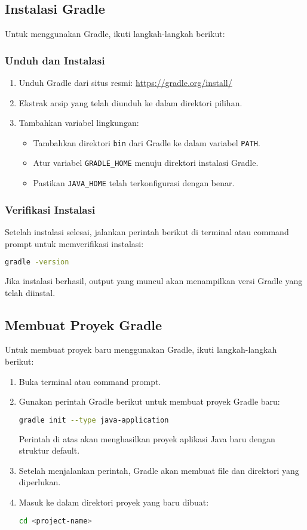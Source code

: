 \subsection{Instalasi Gradle}
Untuk menggunakan Gradle, ikuti langkah-langkah berikut:

\subsubsection{Unduh dan Instalasi}
\begin{enumerate}
	\item Unduh Gradle dari situs resmi: \url{https://gradle.org/install/}
	\item Ekstrak arsip yang telah diunduh ke dalam direktori pilihan.
	\item Tambahkan variabel lingkungan:
	\begin{itemize}
		\item Tambahkan direktori \texttt{bin} dari Gradle ke dalam variabel \texttt{PATH}.
		\item Atur variabel \texttt{GRADLE\_HOME} menuju direktori instalasi Gradle.
		\item Pastikan \texttt{JAVA\_HOME} telah terkonfigurasi dengan benar.
	\end{itemize}
\end{enumerate}

\subsubsection{Verifikasi Instalasi}
Setelah instalasi selesai, jalankan perintah berikut di terminal atau command prompt untuk memverifikasi instalasi:

\begin{lstlisting}[language=bash]
	gradle -version
\end{lstlisting}

Jika instalasi berhasil, output yang muncul akan menampilkan versi Gradle yang telah diinstal.


\subsection{Membuat Proyek Gradle}
Untuk membuat proyek baru menggunakan Gradle, ikuti langkah-langkah berikut:
\begin{enumerate}
	\item Buka terminal atau command prompt.
	\item Gunakan perintah Gradle berikut untuk membuat proyek Gradle baru:
	\begin{lstlisting}[language=bash]
		gradle init --type java-application
	\end{lstlisting}
	Perintah di atas akan menghasilkan proyek aplikasi Java baru dengan struktur default.
	\item Setelah menjalankan perintah, Gradle akan membuat file dan direktori yang diperlukan.
	\item Masuk ke dalam direktori proyek yang baru dibuat:
	\begin{lstlisting}[language=bash]
		cd <project-name>
	\end{lstlisting}
\end{enumerate}


